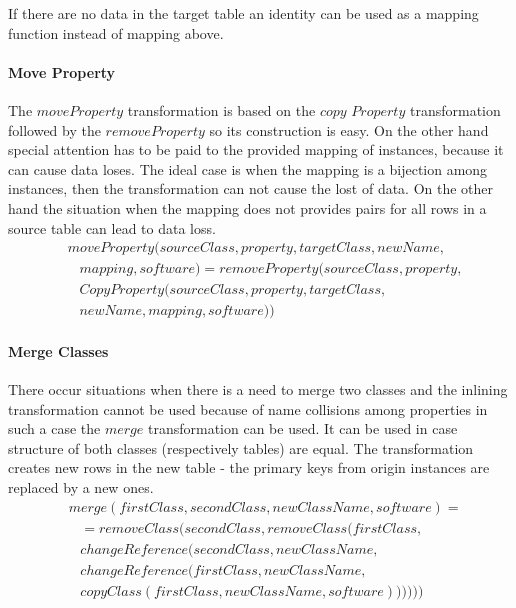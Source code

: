 \documentclass[11pt]{article}
\begin{document}
If there are no data in the target table an identity can be used as a mapping function instead of mapping above. 

\paragraph{Move Property}
The $moveProperty$ transformation is based on the $copy$ $Property$ transformation followed by the $removeProperty$ so its construction is easy. On the other hand special attention has to be paid to the provided mapping of instances, because it can cause data loses. The ideal case is when the mapping is a bijection among instances, then the transformation can not cause the lost of data. On the other hand the situation when the mapping does not provides pairs for all rows in a source table can lead to data loss. 
\begin{align*}
& moveProperty(sourceClass, property, targetClass, newName, \\
& \;\;\; mapping, software) = removeProperty(sourceClass, property, \\
& \;\;\; CopyProperty(sourceClass, property, targetClass, \\ 
& \;\;\;newName, mapping, software))
\end{align*}

\paragraph{Merge Classes}
There occur situations when there is a need to merge two classes and the inlining transformation cannot be used because of name collisions among properties in such a case the $merge$ transformation can be used. It can be used in case structure of both classes (respectively tables) are equal. The transformation creates new rows in the new table - the primary keys from origin instances are replaced by a new ones.
\begin{align*}
& merge(firstClass, secondClass, newClassName, software) = \\
& \; \; \; = removeClass(secondClass, removeClass(firstClass, \\
& \; \; \; changeReference(secondClass, newClassName, \\
& \; \; \; changeReference(firstClass, newClassName, \\
& \; \; \; copyClass(firstClass, newClassName, software))))))
\end{align*}
\end{document}
